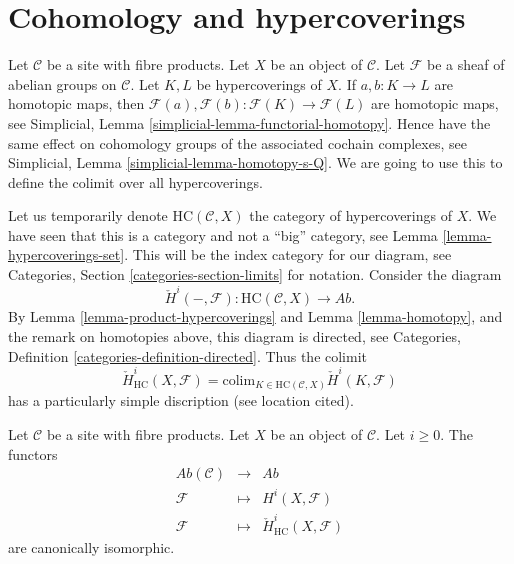 

























\section{Cohomology and hypercoverings}
\label{section-cohomology}

\noindent
Let $\mathcal{C}$ be a site with fibre products.
Let $X$ be an object of $\mathcal{C}$.
Let $\mathcal{F}$ be a sheaf of abelian groups on $\mathcal{C}$.
Let $K, L$ be hypercoverings of $X$.
If $a, b : K \to L$ are homotopic maps,
then $\mathcal{F}(a), \mathcal{F}(b) : \mathcal{F}(K) \to \mathcal{F}(L)$
are homotopic maps, see
Simplicial, Lemma \ref{simplicial-lemma-functorial-homotopy}.
Hence have the same effect on cohomology groups of the associated
cochain complexes, see
Simplicial, Lemma \ref{simplicial-lemma-homotopy-s-Q}.
We are going to use this to define the colimit over all
hypercoverings.

\medskip\noindent
Let us temporarily denote $\text{HC}(\mathcal{C}, X)$
the category of hypercoverings of $X$. We have seen that
this is a category and not a ``big'' category,
see Lemma \ref{lemma-hypercoverings-set}.
This will be the index category for our diagram, see
Categories, Section \ref{categories-section-limits} for notation.
Consider the diagram
$$
\check{H}^i(-, \mathcal{F}) :
\text{HC}(\mathcal{C}, X)
\longrightarrow
\textit{Ab}.
$$
By Lemma \ref{lemma-product-hypercoverings} and
Lemma \ref{lemma-homotopy}, and the remark on homotopies above,
this diagram is directed, see
Categories, Definition \ref{categories-definition-directed}.
Thus the colimit
$$
\check{H}^i_{\text{HC}}(X, \mathcal{F})
=
\text{colim}_{K \in \text{HC}(\mathcal{C}, X)}
\check{H}^i(K, \mathcal{F})
$$
has a particularly simple discription (see location cited).

\begin{theorem}
\label{theorem-cohomology-hypercoverings}
Let $\mathcal{C}$ be a site with fibre products.
Let $X$ be an object of $\mathcal{C}$. Let $i \geq 0$.
The functors
\begin{eqnarray*}
\textit{Ab}(\mathcal{C}) & \longrightarrow & \textit{Ab} \\
\mathcal{F} & \longmapsto & H^i(X, \mathcal{F}) \\
\mathcal{F} & \longmapsto & \check{H}^i_{\text{HC}}(X, \mathcal{F})
\end{eqnarray*}
are canonically isomorphic.
\end{theorem}

